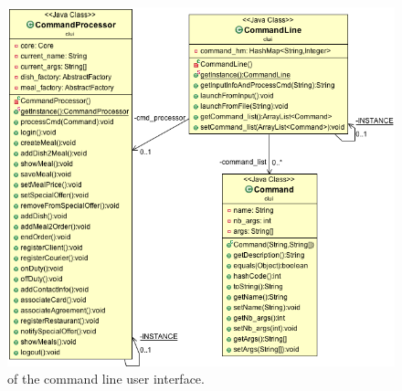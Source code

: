\begin{figure}[H]
  \begin{center}
    \includegraphics[scale=0.57]{./img/CLUI.png}
    \end{center}
  \caption{\umld of the command line user interface.}
  \label{fig:clui_uml}
\end{figure}


